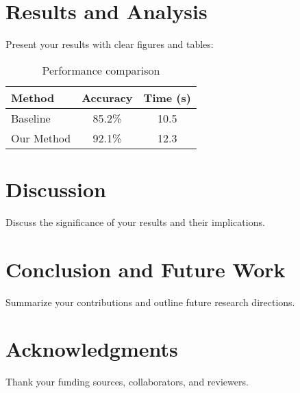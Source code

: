 \documentclass[10pt,twocolumn]{article}
\begin{document}
\section{Results and Analysis}
Present your results with clear figures and tables:

\begin{table}[h]
\centering
\begin{tabular}{|l|c|c|}
\hline
Method & Accuracy & Time (s) \\
\hline
Baseline & 85.2\% & 10.5 \\
Our Method & 92.1\% & 12.3 \\
\hline
\end{tabular}
\caption{Performance comparison}
\label{tab:results}
\end{table}

\section{Discussion}
Discuss the significance of your results and their implications.

\section{Conclusion and Future Work}
Summarize your contributions and outline future research directions.

\section*{Acknowledgments}
Thank your funding sources, collaborators, and reviewers.

\printbibliography

\balance
\end{document}

